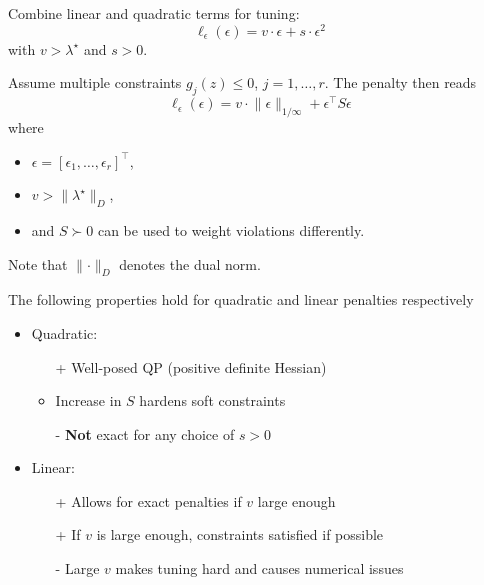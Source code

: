 Combine linear and quadratic terms for tuning:
\begin{equation*}
    \ell_\epsilon(\epsilon) = v \cdot \epsilon + s \cdot \epsilon^2
\end{equation*}
with $v > \lambda^\star$ and $s > 0$.

\newpar{}

Assume multiple constraints $g_j(z) \leq 0$, $j = 1, \dots, r$. The penalty then reads
\begin{equation*}
    \ell_\epsilon(\epsilon) = v \cdot \lVert \epsilon \rVert_{1/\infty} + \epsilon^\top S \epsilon
\end{equation*}
where
\begin{itemize}
    \item $\epsilon = {[\epsilon_1, \dots, \epsilon_r]}^\top$,
    \item $v > \lVert \lambda^\star \rVert_D$,
    \item and $S \succ 0$ can be used to weight violations differently.
\end{itemize}
\newpar{}
Note that $\lVert \cdot \rVert_D$ denotes the dual norm.


The following properties hold for quadratic and linear penalties respectively
\begin{itemize}
    \item Quadratic:
          \begin{itemize}
              \item [+] Well-posed QP (positive definite Hessian)
              \item Increase in $S$ hardens soft constraints
              \item [-] \textbf{Not} exact for any choice of $s>0$
          \end{itemize}
    \item Linear:
          \begin{itemize}
              \item [+] Allows for exact penalties if $v$ large enough
              \item [+] If $v$ is large enough, constraints satisfied if possible
              \item [-] Large $v$ makes tuning hard and causes numerical issues
          \end{itemize}
\end{itemize}

